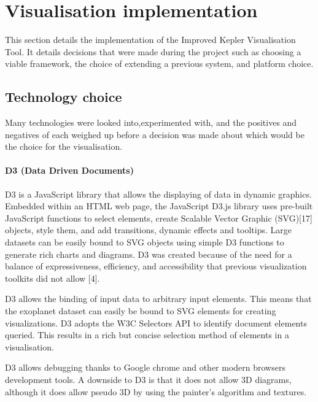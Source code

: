 \chapter{Visualisation implementation}\label{C:sd}
This section details the implementation of the Improved Kepler Visualisation Tool. It details decisions that were made during the project such as choosing a viable framework, the choice of extending a previous system, and  platform choice.   
\section{Technology choice}
Many technologies were looked into,experimented with, and the positives and negatives of each weighed up before a decision was made about which would be the choice for the visualisation. 

\subsubsection{D3 (Data Driven Documents)}
D3 is a JavaScript library that allows the displaying of data in dynamic graphics. Embedded
within an HTML web page, the JavaScript D3.js library uses pre-built JavaScript functions to
select elements, create Scalable Vector Graphic (SVG)[17] objects, style them, and add transitions,
dynamic effects and tooltips. Large datasets can be easily bound to SVG objects using
simple D3 functions to generate rich charts and diagrams. D3 was created because of the
need for a balance of expressiveness, efficiency, and accessibility that previous visualization
toolkits did not allow [4].

D3 allows the binding of input data to arbitrary input elements. This means that the exoplanet
dataset can easily be bound to SVG elements for creating visualizations. D3 adopts
the W3C Selectors API to identify document elements queried. This results in a rich but
concise selection method of elements in a visualisation.

D3 allows debugging thanks to Google chrome and other modern browsers development
tools. A downside to D3 is that it does not allow 3D diagrams, although it does allow
pseudo 3D by using the painter’s algorithm and textures.

